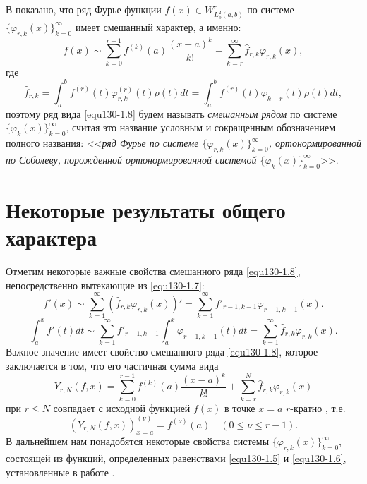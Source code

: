 В \cite{equ130-Shar20} показано,  что ряд Фурье функции $f(x)\in W^r_{L^2_\rho(a,b)}$ по системе  $\{\varphi_{r,k}(x)\}_{k=0}^\infty$ имеет смешанный характер, а именно:
  \begin{equation}\label{equ130-1.8}
f(x)\sim \sum_{k=0}^{r-1} f^{(k)}(a)\frac{(x-a)^k}{k!}+ \sum_{k=r}^\infty \hat f_{r,k}\varphi_{r,k}(x),
\end{equation}
где
  \begin{equation}\label{equ130-1.9}
 \hat f_{r,k}=\int_a^b f^{(r)}(t) \varphi^{(r)}_{r,k}(t)\rho(t)dt=\int_a^b f^{(r)}(t) \varphi_{k-r}(t)\rho(t)dt,
\end{equation}
поэтому ряд  вида \eqref{equ130-1.8} будем  называть \textit{ смешанным рядом} по  системе $\{\varphi_{k}(x)\}_{k=0}^\infty$, считая это название условным и сокращенным обозначением полного названия: <<\textit{ряд Фурье по системе  $\{\varphi_{r,k}(x)\}_{k=0}^\infty$, ортонормированной по Соболеву, порожденной ортонормированной системой $\{\varphi_{k}(x)\}_{k=0}^\infty$}>>.





\section{Некоторые результаты общего характера }

Отметим некоторые важные свойства смешанного ряда \eqref{equ130-1.8}, непосредственно вытекающие из \eqref{equ130-1.7}:
\begin{equation}\label{equ130-2.1}
f'(x)\sim \sum_{k=1}^\infty (\hat f_{r,k}\varphi_{r,k}(x))'= \sum_{k=1}^\infty f'_{r-1,k-1}\varphi_{r-1,k-1}(x).
\end{equation}
\begin{equation}\label{equ130-2.2}
\int_a^xf'(t)dt\sim \sum_{k=1}^\infty f'_{r-1,k-1}\int_a^x\varphi_{r-1,k-1}(t)dt=\sum_{k=1}^\infty \hat f_{r,k}\varphi_{r,k}(x).
\end{equation}
Важное значение имеет свойство  смешанного ряда \eqref{equ130-1.8}, которое заключается в том, что его частичная сумма вида
\begin{equation}\label{equ130-2.3}
Y_{r,N}(f,x)=\sum_{k=0}^{r-1} f^{(k)}(a)\frac{(x-a)^k}{k!}+ \sum_{k=r}^{N} \hat f_{r,k}\varphi_{r,k}(x)
\end{equation}
 при   $r\le N$  совпадает с исходной функцией $f(x)$   в точке $x=a$ $r$-кратно , т.е.
\begin{equation}\label{equ130-2.4}
(Y_{r,N}(f,x))^{(\nu)}_{x=a}=f^{(\nu)}(a)\quad (0\le\nu\le r-1).
\end{equation}
 В дальнейшем нам понадобятся  некоторые  свойства системы $\{\varphi_{r,k}(x)\}_{k=0}^\infty$, состоящей из функций, определенных равенствами   \eqref{equ130-1.5} и \eqref{equ130-1.6}, установленные в работе \cite{equ130-Shar20}.


